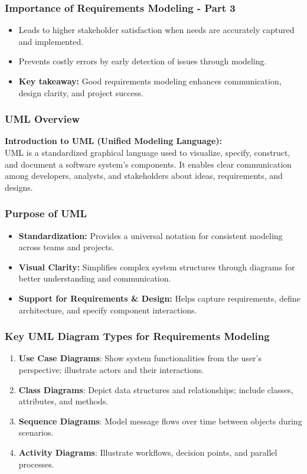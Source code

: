 \documentclass{beamer}
\begin{document}
\begin{frame}[fragile]
    \frametitle{Importance of Requirements Modeling - Part 3}
    \begin{itemize}
        \item Leads to higher stakeholder satisfaction when needs are accurately captured and implemented.
        \item Prevents costly errors by early detection of issues through modeling.
        \item \textbf{Key takeaway:} Good requirements modeling enhances communication, design clarity, and project success.
    \end{itemize}
\end{frame}

\begin{frame}[fragile]
    \frametitle{UML Overview}
    \textbf{Introduction to UML (Unified Modeling Language):} \\
    UML is a standardized graphical language used to visualize, specify, construct, and document a software system's components. It enables clear communication among developers, analysts, and stakeholders about ideas, requirements, and designs.
\end{frame}

\begin{frame}[fragile]
    \frametitle{Purpose of UML}
    \begin{itemize}
        \item \textbf{Standardization:} Provides a universal notation for consistent modeling across teams and projects.
        \item \textbf{Visual Clarity:} Simplifies complex system structures through diagrams for better understanding and communication.
        \item \textbf{Support for Requirements \& Design:} Helps capture requirements, define architecture, and specify component interactions.
    \end{itemize}
\end{frame}

\begin{frame}[fragile]
    \frametitle{Key UML Diagram Types for Requirements Modeling}
    \begin{enumerate}
        \item \textbf{Use Case Diagrams}: Show system functionalities from the user’s perspective; illustrate actors and their interactions.
        \item \textbf{Class Diagrams}: Depict data structures and relationships; include classes, attributes, and methods.
        \item \textbf{Sequence Diagrams}: Model message flows over time between objects during scenarios.
        \item \textbf{Activity Diagrams}: Illustrate workflows, decision points, and parallel processes.
    \end{enumerate}
\end{frame}
\end{document}
